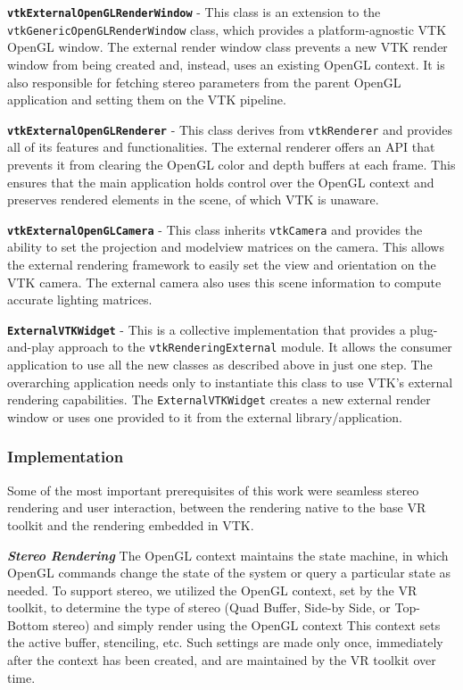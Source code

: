 \textbf{\texttt{vtkExternalOpenGLRenderWindow}} - This class is an extension to
the \texttt{vtkGenericOpenGLRenderWindow} class, which provides a
platform-agnostic VTK OpenGL window.
The external render window class prevents a new VTK render window from being
created and, instead, uses an existing OpenGL context.
It is also responsible for fetching stereo parameters from the parent OpenGL
application and setting them on the VTK pipeline.

\textbf{\texttt{vtkExternalOpenGLRenderer}} - This class derives from
\texttt{vtkRenderer} and provides all of its features and functionalities. The
external renderer offers an API that prevents it from clearing the OpenGL color
and depth buffers at each frame. This ensures that the main application holds
control over the OpenGL context and preserves rendered elements in the scene, of
which VTK is unaware.

\textbf{\texttt{vtkExternalOpenGLCamera}} - This class inherits
\texttt{vtkCamera} and provides the ability to set the projection and modelview
matrices on the camera. This allows the external rendering framework to easily
set the view and orientation on the VTK camera. The external camera also uses
this scene information to compute accurate lighting matrices.

\textbf{\texttt{ExternalVTKWidget}} - This is a collective implementation that
provides a plug-and-play approach to the \texttt{vtkRenderingExternal} module.
It allows the consumer application to use all the new classes as described above
in just one step. The overarching application needs only to instantiate this
class to use VTK's external rendering capabilities. The
\texttt{ExternalVTKWidget} creates a new external render window or uses one
provided to it from the external library/application.

\subsubsection{Implementation}

Some of the most important prerequisites of this work were seamless stereo
rendering and user interaction, between the rendering native to the base VR toolkit and the rendering embedded in VTK. 

\textbf{\textit{Stereo Rendering}} The OpenGL context maintains the state machine, in which OpenGL commands change the state of the system or query a particular state as needed.
To support stereo, we utilized the OpenGL context, set by the VR toolkit, to determine the type of stereo (Quad Buffer, Side-by Side, or Top-Bottom stereo) and simply render using the OpenGL context This context sets the active buffer, stenciling, etc.
Such settings are made only once, immediately after the context has been created, and are maintained by the VR toolkit over time. 

